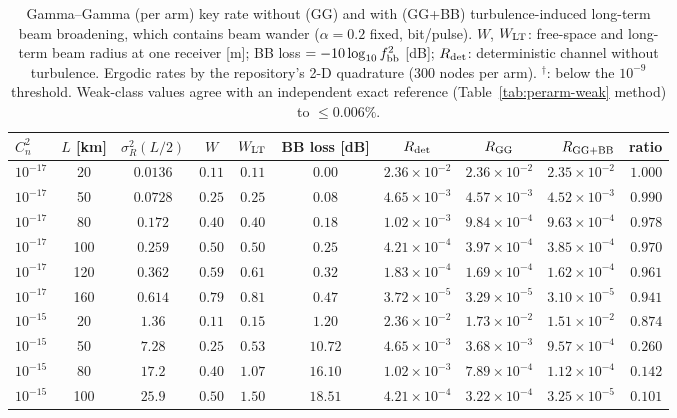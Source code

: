 \begin{table}[htbp]
\centering\scriptsize
\caption{Gamma--Gamma (per arm) key rate without (GG) and with (GG+BB) turbulence-induced long-term beam broadening, which contains beam wander ($\alpha=0.2$ fixed, bit/pulse). $W$, $W_{\rm LT}$: free-space and long-term beam radius at one receiver [m]; BB loss $=-10\log_{10}f_{\rm bb}^2$ [dB]; $R_{\rm det}$: deterministic channel without turbulence. Ergodic rates by the repository's 2-D quadrature (300 nodes per arm). $^{\dagger}$: below the $10^{-9}$ threshold. Weak-class values agree with an independent exact reference (Table~\ref{tab:perarm-weak} method) to $\le0.006\%$.}
\label{tab:bw-skr}
\begin{tabular}{lcccccccrr}
\toprule
$C_n^2$ & $L$ [km] & $\sigma_R^2(L/2)$ & $W$ & $W_{\rm LT}$ & BB loss [dB] & $R_{\rm det}$ & $R_{\rm GG}$ & $R_{\rm GG+BB}$ & ratio\\
\midrule
$10^{-17}$ & 20 & $0.0136$ & $0.11$ & $0.11$ & $0.00$ & $2.36\times10^{-2}$ & $2.36\times10^{-2}$ & $2.35\times10^{-2}$ & $1.000$ \\
$10^{-17}$ & 50 & $0.0728$ & $0.25$ & $0.25$ & $0.08$ & $4.65\times10^{-3}$ & $4.57\times10^{-3}$ & $4.52\times10^{-3}$ & $0.990$ \\
$10^{-17}$ & 80 & $0.172$ & $0.40$ & $0.40$ & $0.18$ & $1.02\times10^{-3}$ & $9.84\times10^{-4}$ & $9.63\times10^{-4}$ & $0.978$ \\
$10^{-17}$ & 100 & $0.259$ & $0.50$ & $0.50$ & $0.25$ & $4.21\times10^{-4}$ & $3.97\times10^{-4}$ & $3.85\times10^{-4}$ & $0.970$ \\
$10^{-17}$ & 120 & $0.362$ & $0.59$ & $0.61$ & $0.32$ & $1.83\times10^{-4}$ & $1.69\times10^{-4}$ & $1.62\times10^{-4}$ & $0.961$ \\
$10^{-17}$ & 160 & $0.614$ & $0.79$ & $0.81$ & $0.47$ & $3.72\times10^{-5}$ & $3.29\times10^{-5}$ & $3.10\times10^{-5}$ & $0.941$ \\
\midrule
$10^{-15}$ & 20 & $1.36$ & $0.11$ & $0.15$ & $1.20$ & $2.36\times10^{-2}$ & $1.73\times10^{-2}$ & $1.51\times10^{-2}$ & $0.874$ \\
$10^{-15}$ & 50 & $7.28$ & $0.25$ & $0.53$ & $10.72$ & $4.65\times10^{-3}$ & $3.68\times10^{-3}$ & $9.57\times10^{-4}$ & $0.260$ \\
$10^{-15}$ & 80 & $17.2$ & $0.40$ & $1.07$ & $16.10$ & $1.02\times10^{-3}$ & $7.89\times10^{-4}$ & $1.12\times10^{-4}$ & $0.142$ \\
$10^{-15}$ & 100 & $25.9$ & $0.50$ & $1.50$ & $18.51$ & $4.21\times10^{-4}$ & $3.22\times10^{-4}$ & $3.25\times10^{-5}$ & $0.101$ \\

\end{tabular}
\end{table}
